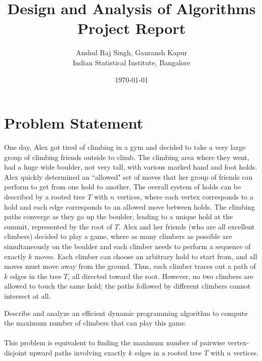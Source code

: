 \documentclass[11pt]{scrartcl}
\theoremstyle{plain}
\theoremstyle{definition}
\theoremstyle{remark}
\newcounter{problem}
\begin{document}
\title{Design and Analysis of Algorithms Project Report}
\author{Anshul Raj Singh, Gauransh Kapur\\ \small{Indian Statistical Institute, Bangalore}}
\date{\today}
\maketitle

\tableofcontents

\section{Problem Statement}
One day, Alex got tired of climbing in a gym and decided to take a very large group of climbing friends outside to climb. The climbing area where they went, had a huge wide boulder, not very tall, with various marked hand and foot holds. Alex quickly determined an ``allowed" set of moves that her group of friends can perform to get from one hold to another. The overall system of holds can be described by a rooted tree
$T$ with $n$ vertices, where each vertex corresponds to a hold and each edge corresponds to an allowed move between holds. The climbing paths converge as they go up the boulder, leading to a unique hold at the summit, represented by the root of $T$. Alex and her friends (who are all excellent climbers) decided to play a game, where as many climbers
as possible are simultaneously on the boulder and each climber needs to perform a sequence of exactly $k$ moves. Each climber can choose an arbitrary hold to start from, and all moves must move away from the ground. Thus, each climber traces out a path of $k$ edges in the tree $T$, all directed toward the root. However, no two climbers are allowed to
touch the same hold; the paths followed by different climbers cannot intersect at all. 

Describe and analyze an efficient dynamic programming algorithm to compute the maximum number of climbers that can play this game.\\\\
This problem is equivalent to finding the maximum number of pairwise vertex-disjoint upward paths involving exactly $k$ edges in a rooted tree $T$ with $n$ vertices.
\end{document}
